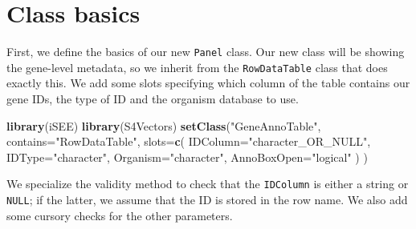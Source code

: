 \documentclass[
]{book}
\newenvironment{Shaded}{\begin{snugshade}}{\end{snugshade}}
\newcommand{\DataTypeTok}[1]{\textcolor[rgb]{0.13,0.29,0.53}{#1}}
\newcommand{\KeywordTok}[1]{\textcolor[rgb]{0.13,0.29,0.53}{\textbf{#1}}}
\newcommand{\NormalTok}[1]{#1}
\newcommand{\StringTok}[1]{\textcolor[rgb]{0.31,0.60,0.02}{#1}}
\begin{document}
\hypertarget{class-basics}{%
\section{Class basics}\label{class-basics}}

First, we define the basics of our new \texttt{Panel} class.
Our new class will be showing the gene-level metadata, so we inherit from the \texttt{RowDataTable} class that does exactly this.
We add some slots specifying which column of the table contains our gene IDs, the type of ID and the organism database to use.

\begin{Shaded}
\begin{Highlighting}[]
\KeywordTok{library}\NormalTok{(iSEE)}
\KeywordTok{library}\NormalTok{(S4Vectors)}
\KeywordTok{setClass}\NormalTok{(}\StringTok{"GeneAnnoTable"}\NormalTok{, }\DataTypeTok{contains=}\StringTok{"RowDataTable"}\NormalTok{,}
    \DataTypeTok{slots=}\KeywordTok{c}\NormalTok{(}
        \DataTypeTok{IDColumn=}\StringTok{"character_OR_NULL"}\NormalTok{, }
        \DataTypeTok{IDType=}\StringTok{"character"}\NormalTok{,}
        \DataTypeTok{Organism=}\StringTok{"character"}\NormalTok{,}
        \DataTypeTok{AnnoBoxOpen=}\StringTok{"logical"}
\NormalTok{    )}
\NormalTok{)}
\end{Highlighting}
\end{Shaded}

We specialize the validity method to check that the \texttt{IDColumn} is either a string or \texttt{NULL};
if the latter, we assume that the ID is stored in the row name.
We also add some cursory checks for the other parameters.
\end{document}
